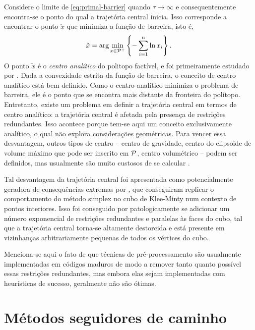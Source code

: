 Considere o limite de \eqref{eq:primal-barrier} quando $\tau\to \infty$ e
consequentemente encontra-se o ponto do qual a trajetória central inicia. Isso
corresponde a encontrar o ponto $\check{x}$ que minimiza a função de barreira,
isto é, 
\[
\check{x} = \arg \min_{x\in\mathcal{P}^+}\left\{-\sum_{i=1}^{n}\ln x_i \right\}.
\]
O ponto $\check{x}$ é o \emph{centro analítico} do politopo factível, e foi
primeiramente estudado por \textcite{Sonnevend:1986ua}. Dada a convexidade estrita
da função de barreira, o conceito de centro analítico está bem definido. Como o
centro analítico minimiza o problema de barreira, ele é o ponto que se encontra
mais distante da fronteira do politopo. Entretanto, existe um problema em
definir a trajetória central em termos de centro analítico: a trajetória central
é afetada pela presença de restrições redundantes. Isso acontece porque tem-se
aqui um conceito exclusivamente analítico, o qual não explora considerações
geométricas. Para vencer essa desvantagem, outros tipos de centro -- centro de
gravidade, centro do elipsoide de volume máximo que pode ser inscrito em
$\mathcal{P}$, centro volumétrico  -- podem ser definidos, mas usualmente são muito
custosos de se calcular \cite{Gonzaga:1992uj}.


Tal desvantagem da trajetória central foi  apresentada como potencialmente
geradora de consequências extremas por \textcite{Deza:2006hm}, que conseguiram
replicar o comportamento do método simplex no cubo de Klee-Minty num contexto de
pontos interiores. Isso foi conseguido por patologicamente se adicionar um
número exponencial de restrições redundantes e paralelas às faces do cubo, tal que a trajetória
central torna-se altamente destorcida e está presente em vizinhanças
arbitrariamente pequenas de todos os vértices do cubo. 

Menciona-se aqui o fato de que técnicas de pré-processamento são usualmente
implementadas em códigos maduros de modo a remover tanto quanto possível essas
restrições redundantes, mas embora elas sejam implementadas com heurísticas de
sucesso, geralmente não são ótimas.







 
\section{Métodos seguidores de caminho\label{sec:path-following-methods}}



